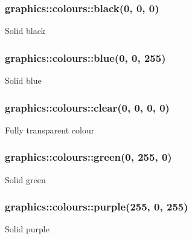 \subsubsection[{\texorpdfstring{black}{black}}]{ graphics\+::colours\+::black(0, 0, 0)}\hypertarget{namespacegraphics_1_1colours_a8a798ac0d239095d3ce98415e05d6fc2}{}\label{namespacegraphics_1_1colours_a8a798ac0d239095d3ce98415e05d6fc2}
Solid black 
\subsubsection[{\texorpdfstring{blue}{blue}}]{ graphics\+::colours\+::blue(0, 0, 255)}\hypertarget{namespacegraphics_1_1colours_aa32d426428f03bc3b9f1a22a7e04bc15}{}\label{namespacegraphics_1_1colours_aa32d426428f03bc3b9f1a22a7e04bc15}
Solid blue 
\subsubsection[{\texorpdfstring{clear}{clear}}]{ graphics\+::colours\+::clear(0, 0, 0, 0)}\hypertarget{namespacegraphics_1_1colours_ab04f0c6bf60c34b31307d665b0c69dba}{}\label{namespacegraphics_1_1colours_ab04f0c6bf60c34b31307d665b0c69dba}
Fully transparent colour 
\subsubsection[{\texorpdfstring{green}{green}}]{ graphics\+::colours\+::green(0, 255, 0)}\hypertarget{namespacegraphics_1_1colours_ad3420b0ddbf2d2e15af0e31942a8fdbf}{}\label{namespacegraphics_1_1colours_ad3420b0ddbf2d2e15af0e31942a8fdbf}
Solid green 
\subsubsection[{\texorpdfstring{purple}{purple}}]{ graphics\+::colours\+::purple(255, 0, 255)}\hypertarget{namespacegraphics_1_1colours_a294778a95817cb872322bf4f3f4555ce}{}\label{namespacegraphics_1_1colours_a294778a95817cb872322bf4f3f4555ce}
Solid purple 
